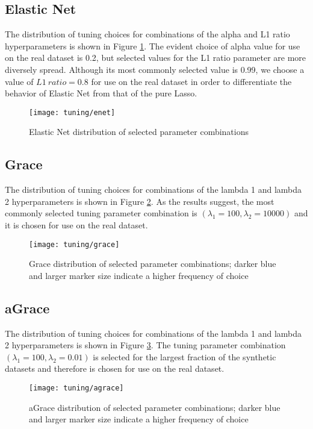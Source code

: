\subsection{Elastic Net}
The distribution of tuning choices for combinations of the alpha and L1 ratio hyperparameters is shown in Figure \ref{fig:tun_enet}. The evident choice of alpha value for use on the real dataset is 0.2, but selected values for the L1 ratio parameter are more diversely spread. Although its most commonly selected value is 0.99, we choose a value of $L1\ ratio = 0.8$ for use on the real dataset in order to differentiate the behavior of Elastic Net from that of the pure Lasso.
\begin{figure}[H]
	\centering
	\texttt{[image: tuning/enet]}
	\caption{Elastic Net distribution of selected parameter combinations}
	\label{fig:tun_enet}
\end{figure}
\pagebreak

\subsection{Grace}
The distribution of tuning choices for combinations of the lambda 1 and lambda 2 hyperparameters is shown in Figure \ref{fig:tun_grace}. As the results suggest, the most commonly selected tuning parameter combination is $(\lambda_1=100,\lambda_2=10000)$ and it is chosen for use on the real dataset.
\begin{figure}[H]
	\centering
	\texttt{[image: tuning/grace]}
	\caption{Grace distribution of selected parameter combinations; darker blue and larger marker size indicate a higher frequency of choice}
	\label{fig:tun_grace}
\end{figure}
\pagebreak

\subsection{aGrace}
The distribution of tuning choices for combinations of the lambda 1 and lambda 2 hyperparameters is shown in Figure \ref{fig:tun_agrace}. The tuning parameter combination $(\lambda_1=100,\lambda_2=0.01)$ is selected for the largest fraction of the synthetic datasets and therefore is chosen for use on the real dataset.
\begin{figure}[H]
	\centering
	\texttt{[image: tuning/agrace]}
	\caption{aGrace distribution of selected parameter combinations; darker blue and larger marker size indicate a higher frequency of choice}
	\label{fig:tun_agrace}
\end{figure}
\pagebreak

